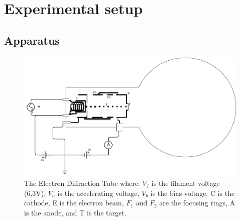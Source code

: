 \documentclass[11pt,letterpaper,onecolumn]{article}
\begin{document}

\section{Experimental setup}



\subsection{Apparatus}

\begin{figure}[H]
 \begin{center}
 \includegraphics*[scale = .5]{Lab2.png}
 \caption{The Electron Diffraction Tube where: $V_f$ is the filament voltage (6.3V), $V_a$ is the accelerating voltage, $V_b$ is the bias voltage, C is the cathode, E is the electron beam, $F_1$ and $F_2$ are the focusing rings, A is the anode, and T is the target. \label{fig:EDT}}
 \end{center}
\end{figure}
\end{document}
